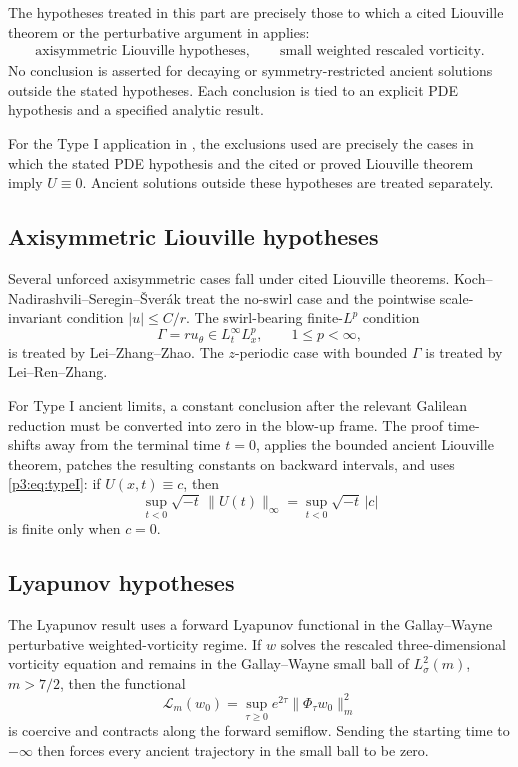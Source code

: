 \documentclass[11pt]{amsart}
\theoremstyle{plain}
\theoremstyle{definition}
\theoremstyle{remark}
\numberwithin{equation}{section}
\begin{document}
The hypotheses treated in this part are precisely those to which a cited
Liouville theorem or the perturbative argument in
 applies:
\[
   \begin{gathered}
   \text{axisymmetric Liouville hypotheses},\qquad
   \text{small weighted rescaled vorticity}.
   \end{gathered}
\]
No conclusion is asserted for decaying or symmetry-restricted ancient solutions
outside the stated hypotheses.  Each conclusion is tied to an explicit
PDE hypothesis and a specified analytic result.

For the Type I application in , the exclusions used are
precisely the cases in which the stated PDE hypothesis and the cited or proved
Liouville theorem imply \(U\equiv0\).  Ancient solutions outside these
hypotheses are treated separately.

\subsection{Axisymmetric Liouville hypotheses}

Several unforced axisymmetric cases fall under cited Liouville theorems.
Koch--Nadirashvili--Seregin--\v{S}ver\'ak treat the no-swirl case
and the pointwise scale-invariant condition \(|u|\le C/r\).  The
swirl-bearing finite-\(L^p\) condition
\[
   \Gamma=ru_\theta\in L_t^\infty L_x^p,\qquad 1\le p<\infty,
\]
is treated by Lei--Zhang--Zhao.  The \(z\)-periodic case with bounded
\(\Gamma\) is treated by Lei--Ren--Zhang.

For Type I ancient limits, a constant conclusion after the relevant Galilean
reduction must be converted into zero in the blow-up frame.  The proof
time-shifts away from the terminal time \(t=0\), applies the bounded ancient
Liouville theorem, patches the resulting constants on backward intervals, and
uses
\eqref{p3:eq:typeI}: if \(U(x,t)\equiv c\), then
\[
   \sup_{t<0}\sqrt{-t}\,\|U(t)\|_\infty
   =
   \sup_{t<0}\sqrt{-t}\,|c|
\]
is finite only when \(c=0\).

\subsection{Lyapunov hypotheses}

The Lyapunov result uses a forward Lyapunov functional in the
Gallay--Wayne perturbative weighted-vorticity regime.  If \(w\)
solves the rescaled three-dimensional vorticity equation and remains in the
Gallay--Wayne small ball of \(L^2_\sigma(m)\), \(m>7/2\), then the functional
\begin{equation}\label{p3:eq:intro-weighted-lyap}
   \mathcal L_m(w_0)
   =
   \sup_{\tau\ge0}e^{2\tau}\|\Phi_\tau w_0\|_m^2
\end{equation}
is coercive and contracts along the forward semiflow.  Sending the starting
time to \(-\infty\) then forces every ancient trajectory in the small ball to
be zero.
\end{document}
